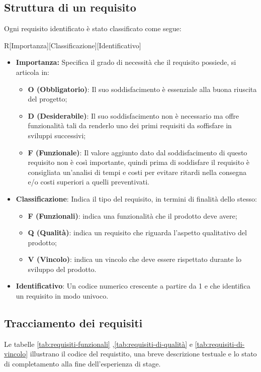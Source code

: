 \subsection{Struttura di un requisito}
Ogni requisito identificato è stato classificato come segue:
\begin{center}
	R[Importanza][Classificazione][Identificativo]
\end{center}
\begin{itemize}
	\item \textbf{Importanza:} Specifica il grado di necessità che il requisito possiede, si articola in:
	\begin{itemize}
		\item \textbf{O (Obbligatorio)}: Il suo soddisfacimento è essenziale alla buona riuscita del progetto;
		\item \textbf{D (Desiderabile)}: Il suo soddisfacimento non è necessario ma offre funzionalità tali da renderlo uno dei primi requisiti da soffisfare in sviluppi successivi;
		\item \textbf{F (Funzionale)}: Il valore aggiunto dato dal soddisfacimento di questo requisito non è così importante, quindi prima di soddisfare il requisito è consigliata un’analisi di tempi e costi per evitare ritardi nella consegna e/o costi superiori a quelli preventivati.
	\end{itemize}
	\item \textbf{Classificazione}: Indica il tipo del requisito, in termini di finalità dello stesso:
	\begin{itemize}
		\item \textbf{F (Funzionali)}: indica una funzionalità che il prodotto deve avere; 
		\item \textbf{Q (Qualità)}: indica un requisito che riguarda l'aspetto qualitativo del prodotto;
		\item \textbf{V (Vincolo)}: indica un vincolo che deve essere rispettato durante lo sviluppo del prodotto.
	\end{itemize} 
	\item \textbf{Identificativo}: Un codice numerico crescente a partire da 1 e che identifica un requisito in modo univoco. 
\end{itemize}

\subsection{Tracciamento dei requisiti}
Le tabelle \ref{tab:requisiti-funzionali} ,\ref{tab:requisiti-di-qualità} e \ref{tab:requisiti-di-vincolo} illustrano il codice del requistito, una breve descrizione testuale e lo stato di completamento alla fine dell'esperienza di stage. \\



